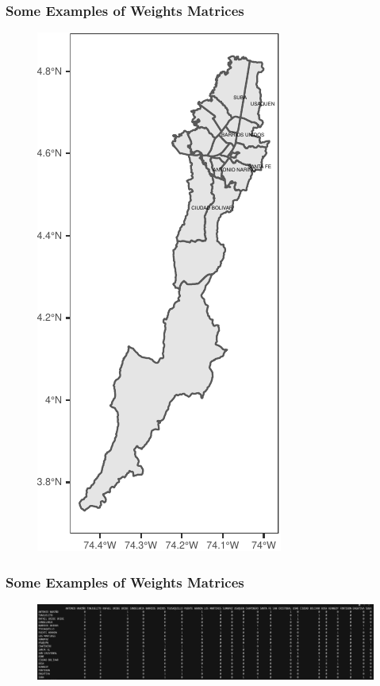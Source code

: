 \documentclass[
  shownotes,
  xcolor={svgnames},
  hyperref={colorlinks,citecolor=DarkBlue,linkcolor=DarkRed,urlcolor=DarkBlue}
  ]{beamer}
\begin{document}
\begin{frame}[fragile]
\frametitle{Some Examples of Weights Matrices}


  \begin{figure}[H] \centering
    \captionsetup{justification=centering}
    \includegraphics[scale=0.6]{figures/localities.pdf}
   \end{figure}

\end{frame}

\begin{frame}[fragile]
\frametitle{Some Examples of Weights Matrices}

  \begin{figure}[H] \centering
    \captionsetup{justification=centering}
    \includegraphics[scale=0.25]{figures/matrix_loc}
   \end{figure}

\end{frame}
\end{document}

